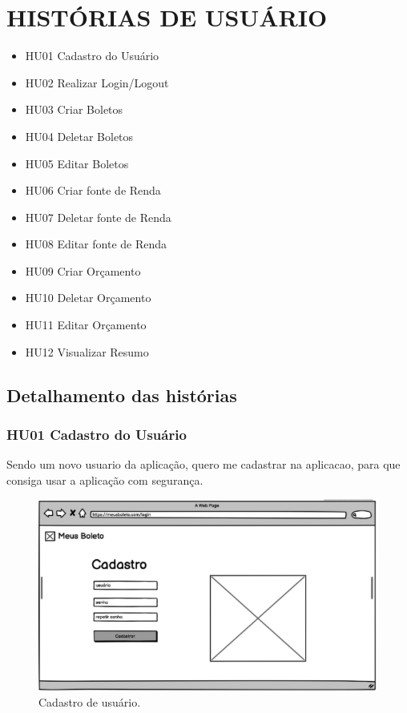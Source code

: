 \chapter{HISTÓRIAS DE USUÁRIO}

\begin{itemize}
    \item HU01 Cadastro do Usuário
    \item HU02 Realizar Login/Logout
    \item HU03 Criar Boletos
    \item HU04 Deletar Boletos
    \item HU05 Editar Boletos
    \item HU06 Criar fonte de Renda
    \item HU07 Deletar fonte de Renda
    \item HU08 Editar fonte de Renda
    \item HU09 Criar Orçamento
    \item HU10 Deletar Orçamento
    \item HU11 Editar Orçamento
    \item HU12 Visualizar Resumo

\end{itemize}

\section{Detalhamento das histórias}

\subsection{HU01 Cadastro do Usuário}

Sendo um novo usuario da aplicação, quero me cadastrar na aplicacao, para que consiga usar a aplicação com segurança.

\begin{figure}[htb]
	\caption{\label{fig:hu01}Cadastro de usuário.}
	\begin{center}
		\includegraphics[scale=0.5]{images/Cadastro.png}
	\end{center}
\end{figure}

